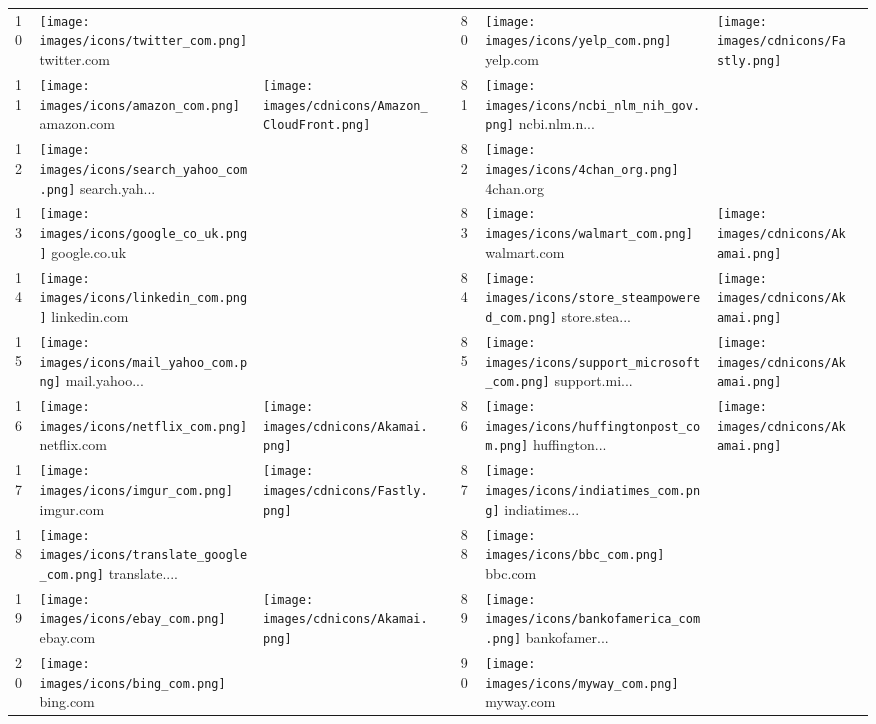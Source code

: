 \begin{table}[tbp]
\begin{tabular}{|llll|llll|}
10 & \texttt{[image: images/icons/twitter\_com.png]} twitter.com & & & 80 & \texttt{[image: images/icons/yelp\_com.png]} yelp.com & \texttt{[image: images/cdnicons/Fastly.png]} & \\
11 & \texttt{[image: images/icons/amazon\_com.png]} amazon.com & \texttt{[image: images/cdnicons/Amazon\_CloudFront.png]} & & 81 & \texttt{[image: images/icons/ncbi\_nlm\_nih\_gov.png]} ncbi.nlm.n... & & \\
12 & \texttt{[image: images/icons/search\_yahoo\_com.png]} search.yah... & & & 82 & \texttt{[image: images/icons/4chan\_org.png]} 4chan.org & & \\
13 & \texttt{[image: images/icons/google\_co\_uk.png]} google.co.uk & & & 83 & \texttt{[image: images/icons/walmart\_com.png]} walmart.com & \texttt{[image: images/cdnicons/Akamai.png]} & \\
14 & \texttt{[image: images/icons/linkedin\_com.png]} linkedin.com & & & 84 & \texttt{[image: images/icons/store\_steampowered\_com.png]} store.stea... & \texttt{[image: images/cdnicons/Akamai.png]} & \\
15 & \texttt{[image: images/icons/mail\_yahoo\_com.png]} mail.yahoo... & & & 85 & \texttt{[image: images/icons/support\_microsoft\_com.png]} support.mi... & \texttt{[image: images/cdnicons/Akamai.png]} & \\
16 & \texttt{[image: images/icons/netflix\_com.png]} netflix.com & \texttt{[image: images/cdnicons/Akamai.png]} & & 86 & \texttt{[image: images/icons/huffingtonpost\_com.png]} huffington... & \texttt{[image: images/cdnicons/Akamai.png]} & \\
17 & \texttt{[image: images/icons/imgur\_com.png]} imgur.com & \texttt{[image: images/cdnicons/Fastly.png]} & & 87 & \texttt{[image: images/icons/indiatimes\_com.png]} indiatimes... & & \\
18 & \texttt{[image: images/icons/translate\_google\_com.png]} translate.... & & & 88 & \texttt{[image: images/icons/bbc\_com.png]} bbc.com & & \\
19 & \texttt{[image: images/icons/ebay\_com.png]} ebay.com & \texttt{[image: images/cdnicons/Akamai.png]} & & 89 & \texttt{[image: images/icons/bankofamerica\_com.png]} bankofamer... & & \\
20 & \texttt{[image: images/icons/bing\_com.png]} bing.com & & & 90 & \texttt{[image: images/icons/myway\_com.png]} myway.com & & \\

\end{tabular}
\end{table}
